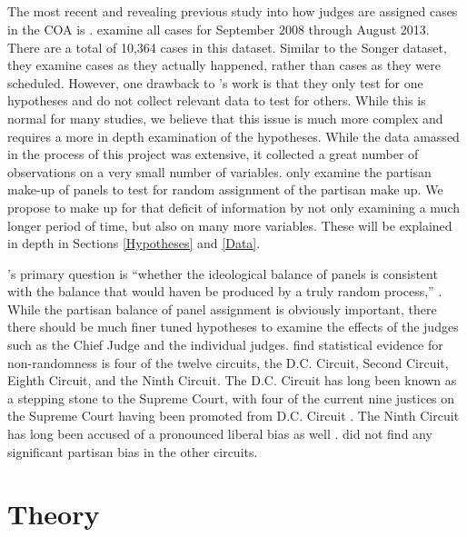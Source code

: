\documentclass[12pt]{article}
\begin{document}
\subsection*{\cite{Chilton2014}}
The most recent and revealing previous study into how judges are assigned cases in the COA is \cite{Chilton2014}.  \citeauthor{Chilton2014} examine all cases for September 2008 through August 2013.  There are a total of 10,364 cases in this dataset.  Similar to the Songer dataset, they examine cases as they actually happened, rather than cases as they were scheduled.  However, one drawback to \citeauthor{Chilton2014}'s work is that they only test for one hypotheses and do not collect relevant data to test for others.  While this is normal for many studies, we believe that this issue is much more complex and requires a more in depth examination of the hypotheses.  While the data amassed in the process of this project was extensive, it collected a great number of observations on a very small number of variables.  \citeauthor{Chilton2014} only examine the partisan make-up of panels to test for random assignment of the partisan make up.  We propose to make up for that deficit of information by not only examining a much longer period of time, but also on many more variables. These will be explained in depth in Sections \ref{Hypotheses} and \ref{Data}.  

\citeauthor{Chilton2014}'s primary question is ``whether the ideological balance of panels is consistent with the balance that would haven be produced by a truly random process,'' \citep[20]{Chilton2014}.  While the partisan balance of panel assignment is obviously important, there there should be much finer tuned hypotheses to examine the effects of the judges such as the Chief Judge and the individual judges.  \citeauthor{Chilton2014} find statistical evidence for non-randomness is four of the twelve circuits, the D.C. Circuit, Second Circuit, Eighth Circuit, and the Ninth Circuit.  The D.C. Circuit has long been known as a stepping stone to the Supreme Court, with four of the current nine justices on the Supreme Court having been promoted from D.C. Circuit \citep{FJC}.  The Ninth Circuit has long been accused of a pronounced liberal bias as well \citep{farris1997ninth,scott2006supreme,herald1998reversed,chemerinsky2003myth,chemerinsky2003myth,goldman1968conflict}.  \citeauthor{Chilton2014} did not find any significant partisan bias in the other circuits.

\section{Theory}\label{Theory}
\end{document}
